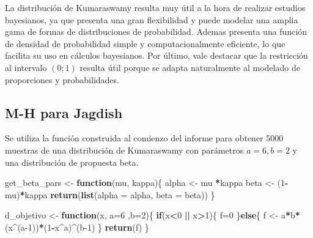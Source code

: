 \documentclass[
]{article}
\newenvironment{Shaded}{\begin{snugshade}}{\end{snugshade}}
\newcommand{\AttributeTok}[1]{\textcolor[rgb]{0.13,0.29,0.53}{#1}}
\newcommand{\ControlFlowTok}[1]{\textcolor[rgb]{0.13,0.29,0.53}{\textbf{#1}}}
\newcommand{\DecValTok}[1]{\textcolor[rgb]{0.00,0.00,0.81}{#1}}
\newcommand{\FunctionTok}[1]{\textcolor[rgb]{0.13,0.29,0.53}{\textbf{#1}}}
\newcommand{\NormalTok}[1]{#1}
\newcommand{\OtherTok}[1]{\textcolor[rgb]{0.56,0.35,0.01}{#1}}
\newcommand{\SpecialCharTok}[1]{\textcolor[rgb]{0.81,0.36,0.00}{\textbf{#1}}}
\begin{document}
La distribución de Kumaraswamy resulta muy útil a la hora de realizar
estudios bayesianos, ya que presenta una gran flexibilidad y puede
modelar una amplia gama de formas de distribuciones de probabilidad.
Ademas presenta una función de densidad de probabilidad simple y
computacionalmente eficiente, lo que facilita su uso en cálculos
bayesianos. Por último, vale destacar que la restricción al intervalo
\((0;1)\) resulta útil porque se adapta naturalmente al modelado de
proporciones y probabilidades.

\hypertarget{m-h-para-jagdish}{%
\subsection{M-H para Jagdish}\label{m-h-para-jagdish}}

Se utiliza la función construida al comienzo del informe para obtener
5000 muestras de una distribución de Kumaraswamy con parámetros
\(a=6 , b=2\) y una distribución de propuesta beta.

\begin{Shaded}
\begin{Highlighting}[]
\NormalTok{get\_beta\_pars }\OtherTok{\textless{}{-}} \ControlFlowTok{function}\NormalTok{(mu, kappa)\{}
\NormalTok{  alpha }\OtherTok{\textless{}{-}}\NormalTok{ mu }\SpecialCharTok{*}\NormalTok{kappa}
\NormalTok{  beta }\OtherTok{\textless{}{-}}\NormalTok{ (}\DecValTok{1}\SpecialCharTok{{-}}\NormalTok{mu)}\SpecialCharTok{*}\NormalTok{kappa}
  \FunctionTok{return}\NormalTok{(}\FunctionTok{list}\NormalTok{(}\AttributeTok{alpha =}\NormalTok{ alpha, }\AttributeTok{beta =}\NormalTok{ beta))}
\NormalTok{\}}

\NormalTok{d\_objetivo }\OtherTok{\textless{}{-}} \ControlFlowTok{function}\NormalTok{(x, }\AttributeTok{a=}\DecValTok{6}\NormalTok{ ,}\AttributeTok{b=}\DecValTok{2}\NormalTok{)\{}
  \ControlFlowTok{if}\NormalTok{(x}\SpecialCharTok{\textless{}}\DecValTok{0} \SpecialCharTok{||}\NormalTok{ x}\SpecialCharTok{\textgreater{}}\DecValTok{1}\NormalTok{)\{}
\NormalTok{    f}\OtherTok{=}\DecValTok{0}
\NormalTok{  \}}\ControlFlowTok{else}\NormalTok{\{}
\NormalTok{    f }\OtherTok{\textless{}{-}}\NormalTok{ a}\SpecialCharTok{*}\NormalTok{b}\SpecialCharTok{*}\NormalTok{(x}\SpecialCharTok{\^{}}\NormalTok{(a}\DecValTok{{-}1}\NormalTok{))}\SpecialCharTok{*}\NormalTok{(}\DecValTok{1}\SpecialCharTok{{-}}\NormalTok{x}\SpecialCharTok{\^{}}\NormalTok{a)}\SpecialCharTok{\^{}}\NormalTok{(b}\DecValTok{{-}1}\NormalTok{)}
\NormalTok{  \}}
  \FunctionTok{return}\NormalTok{(f)}
\NormalTok{\}}
\end{Highlighting}
\end{Shaded}
\end{document}
